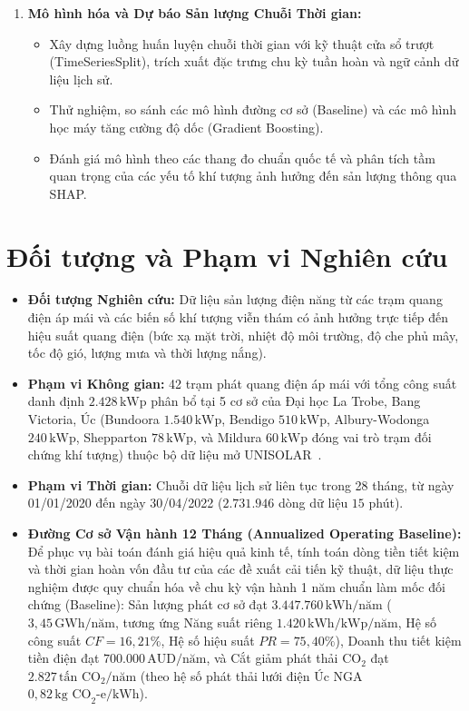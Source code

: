 \documentclass[12pt, a4paper]{report}
\begin{document}
\begin{enumerate}[label=\arabic*., leftmargin=*]
    \item \textbf{Mô hình hóa và Dự báo Sản lượng Chuỗi Thời gian:}
    \begin{itemize}[noitemsep]
        \item Xây dựng luồng huấn luyện chuỗi thời gian với kỹ thuật cửa sổ trượt (TimeSeriesSplit), trích xuất đặc trưng chu kỳ tuần hoàn và ngữ cảnh dữ liệu lịch sử.
        \item Thử nghiệm, so sánh các mô hình đường cơ sở (Baseline) và các mô hình học máy tăng cường độ dốc (Gradient Boosting).
        \item Đánh giá mô hình theo các thang đo chuẩn quốc tế và phân tích tầm quan trọng của các yếu tố khí tượng ảnh hưởng đến sản lượng thông qua SHAP.
    \end{itemize}
\end{enumerate}

\section{Đối tượng và Phạm vi Nghiên cứu}
\label{sec:phamvi}

\begin{itemize}[noitemsep]
    \item \textbf{Đối tượng Nghiên cứu:} Dữ liệu sản lượng điện năng từ các trạm quang điện áp mái và các biến số khí tượng viễn thám có ảnh hưởng trực tiếp đến hiệu suất quang điện (bức xạ mặt trời, nhiệt độ môi trường, độ che phủ mây, tốc độ gió, lượng mưa và thời lượng nắng).
    \item \textbf{Phạm vi Không gian:} 42 trạm phát quang điện áp mái với tổng công suất danh định $2.428\,\text{kWp}$ phân bổ tại 5 cơ sở của Đại học La Trobe, Bang Victoria, Úc (Bundoora $1.540\,\text{kWp}$, Bendigo $510\,\text{kWp}$, Albury-Wodonga $240\,\text{kWp}$, Shepparton $78\,\text{kWp}$, và Mildura $60\,\text{kWp}$ đóng vai trò trạm đối chứng khí tượng) thuộc bộ dữ liệu mở UNISOLAR~\cite{wimalaratne2022unisolar}.
    \item \textbf{Phạm vi Thời gian:} Chuỗi dữ liệu lịch sử liên tục trong 28 tháng, từ ngày 01/01/2020 đến ngày 30/04/2022 ($2.731.946$ dòng dữ liệu $15$ phút).
    \item \textbf{Đường Cơ sở Vận hành 12 Tháng (Annualized Operating Baseline):} Để phục vụ bài toán đánh giá hiệu quả kinh tế, tính toán dòng tiền tiết kiệm và thời gian hoàn vốn đầu tư của các đề xuất cải tiến kỹ thuật, dữ liệu thực nghiệm được quy chuẩn hóa về chu kỳ vận hành 1 năm chuẩn làm mốc đối chứng (Baseline): Sản lượng phát cơ sở đạt $3.447.760\,\text{kWh/năm}$ ($3{,}45\,\text{GWh/năm}$, tương ứng Năng suất riêng $1.420\,\text{kWh/kWp/năm}$, Hệ số công suất $CF = 16{,}21\%$, Hệ số hiệu suất $PR = 75{,}40\%$), Doanh thu tiết kiệm tiền điện đạt $700.000\,\text{AUD/năm}$, và Cắt giảm phát thải $\text{CO}_2$ đạt $2.827\,\text{tấn CO}_2\text{/năm}$ (theo hệ số phát thải lưới điện Úc NGA $0{,}82\,\text{kg CO}_2\text{-e/kWh}$).
\end{itemize}
\end{document}
